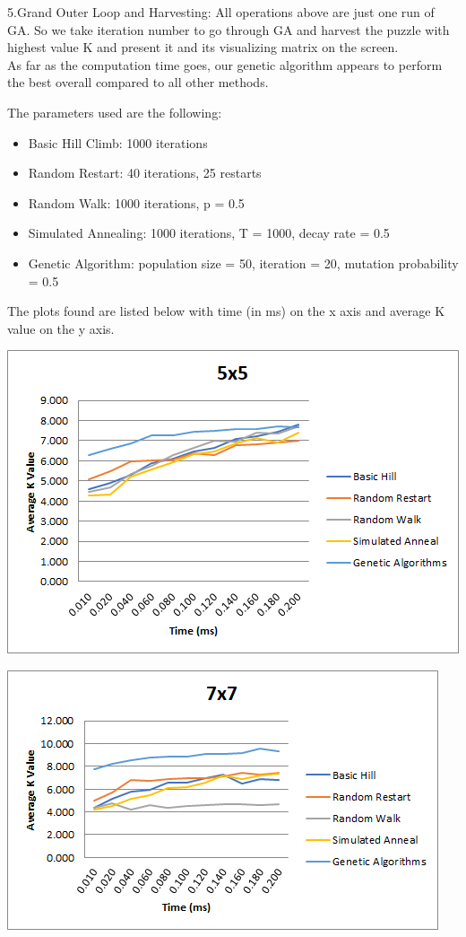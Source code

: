 \documentclass[12pt, letterpaper]{article}
\begin{document}
5.Grand Outer Loop and Harvesting: All operations above are just one run of GA. So we take iteration number to go through GA and harvest the puzzle with highest value K and present it and its visualizing matrix on the screen.\\

As far as the computation time goes, our genetic algorithm appears to perform the best overall compared to all other methods. 

The parameters used are the following:

\begin{itemize}
	\item Basic Hill Climb: 1000 iterations
	\item Random Restart: 40 iterations, 25 restarts
	\item Random Walk: 1000 iterations, p = 0.5
	\item Simulated Annealing: 1000 iterations, T = 1000, decay rate = 0.5
	\item Genetic Algorithm: population size = 50, iteration = 20, mutation probability = 0.5
\end{itemize}

The plots found are listed below with time (in ms) on the x axis and average K value on the y axis.

\includegraphics[width=\linewidth]{"Task 7/5x5 Timeplot"}

\includegraphics[width=\linewidth]{"Task 7/7x7 Timeplot"}
\end{document}

